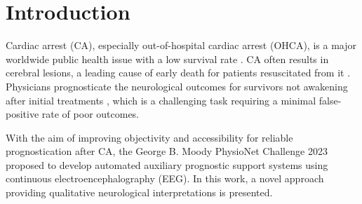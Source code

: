 \section{Introduction}
\label{sec:intro}


Cardiac arrest (CA), especially out-of-hospital cardiac arrest (OHCA), is a major worldwide public health issue with a low survival rate \cite{Yan_2020_Global}. CA often results in cerebral lesions, a leading cause of early death for patients resuscitated from it \cite{Benghanem_2022_Prog}. Physicians prognosticate the neurological outcomes for survivors not awakening after initial treatments \cite{Cronberg_2020_Brain}, which is a challenging task requiring a minimal false-positive rate of poor outcomes.

With the aim of improving objectivity and accessibility for reliable prognostication after CA, the George B. Moody PhysioNet Challenge 2023 \cite{goldberger2000physionet, cinc2023} proposed to develop automated auxiliary prognostic support systems using continuous electroencephalography (EEG). In this work, a novel approach providing qualitative neurological interpretations is presented.
